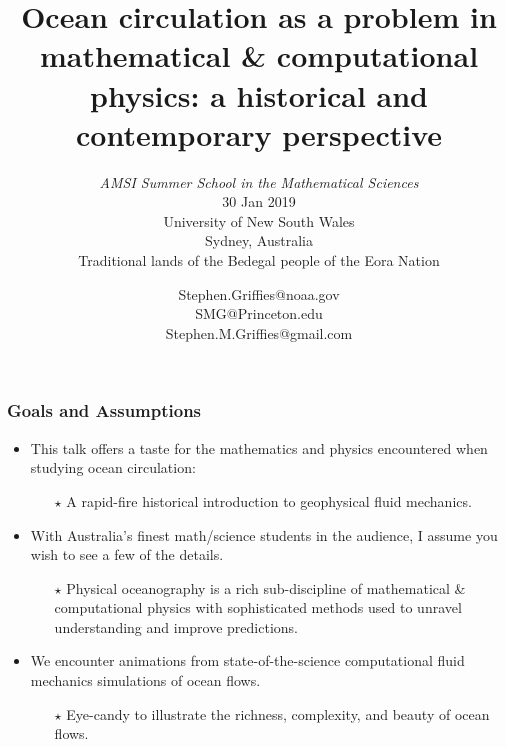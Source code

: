 \documentclass[10pt]{beamer}
\title[Ocean circulation]{ Ocean circulation
  as a problem in mathematical \& computational physics:  a historical
  and contemporary  perspective} %
\subtitle{ {\it AMSI Summer School in the Mathematical Sciences} \\
  30 Jan 2019 \\ \vspace{.25cm}
  University of New South Wales \\
 Sydney, Australia  \\ Traditional lands of the Bedegal people of the Eora Nation
}
\author[{\sc Stephen.M.Griffies@gmail.com}] %
{ {\sc Stephen.Griffies@noaa.gov  \\ SMG@Princeton.edu \\  Stephen.M.Griffies@gmail.com 
} 
}
\institute[NOA/GFDL + Princeton University]{NOAA/GFDL + Princeton University}
\date{}
\begin{document}
  
\begin{frame}
  \titlepage
\end{frame}


\begin{frame}
  \frametitle{Goals and Assumptions}


\begin{exampleblock}{}
\begin{itemize}

\item This talk offers a taste for the mathematics and physics
  encountered when studying ocean circulation:
  \begin{itemize}
    \item[$\star$] A rapid-fire historical introduction to geophysical fluid mechanics.  
  \end{itemize}

\item With Australia's finest math/science students in the audience, I
  assume you wish to see a few of the details. 
  \begin{itemize}
  \item[$\star$] Physical oceanography is a rich sub-discipline of
    mathematical \& computational physics with sophisticated methods
    used to unravel understanding and improve predictions.
  \end{itemize}

\item We encounter animations from state-of-the-science computational
  fluid mechanics simulations of ocean flows.
  \begin{itemize}
  \item[$\star$] Eye-candy to illustrate the richness, complexity, and
    beauty of ocean flows.
  \end{itemize}

\end{itemize}
\end{exampleblock}{}

\end{frame}
\end{document}

